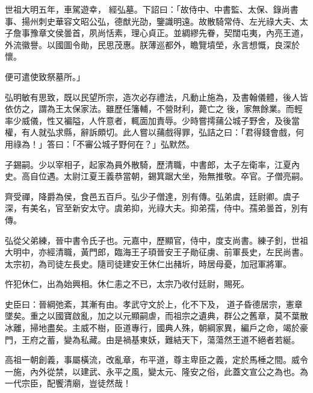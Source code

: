 \begin{pinyinscope}
 世祖大明五年，車駕遊幸，
 經弘墓。下詔曰：「故侍中、中書監、太保、錄尚書事、揚州刺史華容文昭公弘，德猷光劭，鑒識明遠。故散騎常侍、左光祿大夫、太子詹事豫章文侯曇首，夙尚恬素，理心貞正。並綢繆先眷，契闊屯夷，內亮王道，外流徽譽。以國圖令勛，民思茂惠。朕薄巡都外，瞻覽墳塋，永言想慨，良深於懷。



 便可遣使致祭墓所。」



 弘明敏有思致，既以民望所宗，造次必存禮法，凡動止施為，及書翰儀體，後人皆依仿之，謂為王太保家法。雖歷任籓輔，不營財利，薨亡之
 後，家無餘業。而輕率少威儀，性又褊隘，人忤意者，輒面加責辱。少時嘗摴蒱公城子野舍，及後當權，有人就弘求縣，辭訴頗切。此人嘗以蒱戲得罪，弘詰之曰：「君得錢會戲，何用祿為！」答曰：「不審公城子野何在？」弘默然。



 子錫嗣。少以宰相子，起家為員外散騎，歷清職，中書郎，太子左衛率，江夏內史。高自位遇。太尉江夏王義恭當朝，錫箕踞大坐，殆無推敬。卒官。子僧亮嗣。



 齊受禪，降爵為侯，食邑五百戶。弘少子僧達，別有傳。弘弟虞，廷尉卿。虞子
 深，有美名，官至新安太守。虞弟抑，光祿大夫。抑弟孺，侍中。孺弟曇首，別有傳。



 弘從父弟練，晉中書令氏子也。元嘉中，歷顯官，侍中，度支尚書。練子釗，世祖大明中，亦經清職，黃門郎，臨海王子頊晉安王子勛征虜、前軍長史，左民尚書。太宗初，為司徒左長史。隨司徒建安王休仁出赭圻，時居母憂，加冠軍將軍。



 忤犯休仁，出為始興相。休仁恚之不已，太宗乃收付廷尉，賜死。



 史臣曰：晉綱弛紊，其漸有由。孝武守文於上，化不下及，
 道子昏德居宗，憲章墜矣。重之以國寶啟亂，加之以元顯嗣虐，而祖宗之遺典，群公之舊章，莫不葉散冰離，掃地盡矣。主威不樹，臣道專行，國典人殊，朝綱家異，編戶之命，竭於豪門，王府之蓄，變為私藏。由是禍基東妖，難結天下，蕩蕩然王道不絕者若綖。



 高祖一朝創義，事屬橫流，改亂章，布平道，尊主卑臣之義，定於馬棰之間。威令一施，內外從禁，以建武、永平之風，變太元、隆安之俗，此蓋文宣公之為也。為一代宗臣，配饗清廟，豈徒然哉！



\end{pinyinscope}